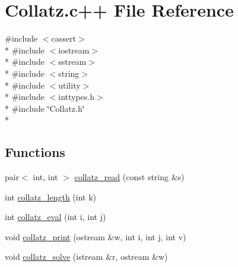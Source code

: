 \hypertarget{Collatz_8c_09_09}{\section{Collatz.\-c++ File Reference}
\label{Collatz_8c_09_09}
}
{\ttfamily \#include $<$cassert$>$}\\*
{\ttfamily \#include $<$iostream$>$}\\*
{\ttfamily \#include $<$sstream$>$}\\*
{\ttfamily \#include $<$string$>$}\\*
{\ttfamily \#include $<$utility$>$}\\*
{\ttfamily \#include $<$inttypes.\-h$>$}\\*
{\ttfamily \#include \char`\"{}Collatz.\-h\char`\"{}}\\*
\subsection*{Functions}
\begin{DoxyCompactItemize}
\item 
pair$<$ int, int $>$ \hyperlink{Collatz_8c_09_09_aeb2edb6ee16627fa3682f57c7cbf3662}{collatz\-\_\-read} (const string \&s)
\item 
int \hyperlink{Collatz_8c_09_09_a29fab7b0d712dabd2f21c1b7bf5218a5}{collatz\-\_\-length} (int k)
\item 
int \hyperlink{Collatz_8c_09_09_a0b0d3827a619c18aa4d96b8ee8b1c47d}{collatz\-\_\-eval} (int i, int j)
\item 
void \hyperlink{Collatz_8c_09_09_aeda0b7ea3e40e1e7487ccc436f33a559}{collatz\-\_\-print} (ostream \&w, int i, int j, int v)
\item 
void \hyperlink{Collatz_8c_09_09_a0ac646d2122741f9a9a52201bf9551cc}{collatz\-\_\-solve} (istream \&r, ostream \&w)
\end{DoxyCompactItemize}
